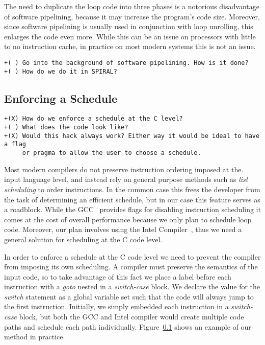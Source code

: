 \documentclass[10pt]{article}
\begin{document}
The need to duplicate the loop code into three phases is a notorious disadvantage of software
pipelining, because it may increase the program's code size. Moreover, since software pipelining
is usually used in conjunction with loop unrolling, this enlarges the code
even more. While this can be an issue on processors with little to no
instruction cache, in practice on most modern systems this is not an issue.

\begin{verbatim}
+( ) Go into the background of software pipelining. How is it done?
+( ) How do we do it in SPIRAL?
\end{verbatim}

\subsection{Enforcing a Schedule}
\begin{verbatim}
+(X) How do we enforce a schedule at the C level?
+( ) What does the code look like?
+(X) Would this hack always work? Either way it would be ideal to have a flag
     or pragma to allow the user to choose a schedule.

\end{verbatim}
Most modern compilers do not preserve instruction ordering imposed at the.
input language level, and instead rely on general purpose methods such
as \emph{list scheduling} to order instructions. In the common case this frees
the developer from the task of determining an efficient schedule, but in our
case this feature serves as a roadblock. While the GCC~\cite{} provides flags for
disabling instruction scheduling it comes at the cost of overall
performance because we only plan to schedule loop code. Moreover, our plan
involves using the Intel Compiler~\cite{}, thus we need a general solution for
scheduling at the C code level.

In order to enforce a schedule at the C code level we need to prevent the
compiler from imposing its own scheduling. A compiler must preserve the
semantics of the input code, so to take advantage of this fact we place a
label before each instruction with a \emph{goto} nested in
a \emph{switch-case} block. We declare the value for the \emph{switch}
statement as a global variable set such that the code will always jump to the
first instruction. Initially, we simply embedded each instruction in
a \emph{switch-case} block, but both the GCC and Intel compiler would create
multiple code paths and schedule each path individually. Figure~\ref{} shows
an example of our method in practice.
\end{document}
